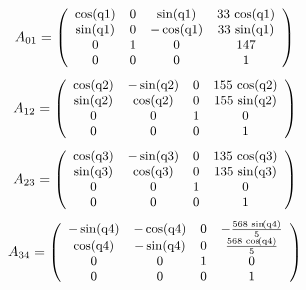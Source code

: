 \documentclass[fleqn, a4paper, 5pt, russian]{article}
\begin{document}
\begin{landscape}

\begin{equation}
\small{
	A_{01}=
	\left(\begin{array}{cccc} \cos\!\left(\mathrm{q1}\right) & 0 & \sin\!\left(\mathrm{q1}\right) & 33\, \cos\!\left(\mathrm{q1}\right)\\ \sin\!\left(\mathrm{q1}\right) & 0 & - \cos\!\left(\mathrm{q1}\right) & 33\, \sin\!\left(\mathrm{q1}\right)\\ 0 & 1 & 0 & 147\\ 0 & 0 & 0 & 1 \end{array}\right)
}\end{equation}
\begin{equation}
\small{
	A_{12}=
	\left(\begin{array}{cccc} \cos\!\left(\mathrm{q2}\right) & - \sin\!\left(\mathrm{q2}\right) & 0 & 155\, \cos\!\left(\mathrm{q2}\right)\\ \sin\!\left(\mathrm{q2}\right) & \cos\!\left(\mathrm{q2}\right) & 0 & 155\, \sin\!\left(\mathrm{q2}\right)\\ 0 & 0 & 1 & 0\\ 0 & 0 & 0 & 1 \end{array}\right)
}\end{equation}
\begin{equation}
\small{
	A_{23}=
	\left(\begin{array}{cccc} \cos\!\left(\mathrm{q3}\right) & - \sin\!\left(\mathrm{q3}\right) & 0 & 135\, \cos\!\left(\mathrm{q3}\right)\\ \sin\!\left(\mathrm{q3}\right) & \cos\!\left(\mathrm{q3}\right) & 0 & 135\, \sin\!\left(\mathrm{q3}\right)\\ 0 & 0 & 1 & 0\\ 0 & 0 & 0 & 1 \end{array}\right)
}\end{equation}
\begin{equation}
\small{
	A_{34}=
	\left(\begin{array}{cccc} - \sin\!\left(\mathrm{q4}\right) & - \cos\!\left(\mathrm{q4}\right) & 0 & -\frac{568\, \sin\!\left(\mathrm{q4}\right)}{5}\\ \cos\!\left(\mathrm{q4}\right) & - \sin\!\left(\mathrm{q4}\right) & 0 & \frac{568\, \cos\!\left(\mathrm{q4}\right)}{5}\\ 0 & 0 & 1 & 0\\ 0 & 0 & 0 & 1 \end{array}\right)
}\end{equation}

\end{landscape}
\end{document}
